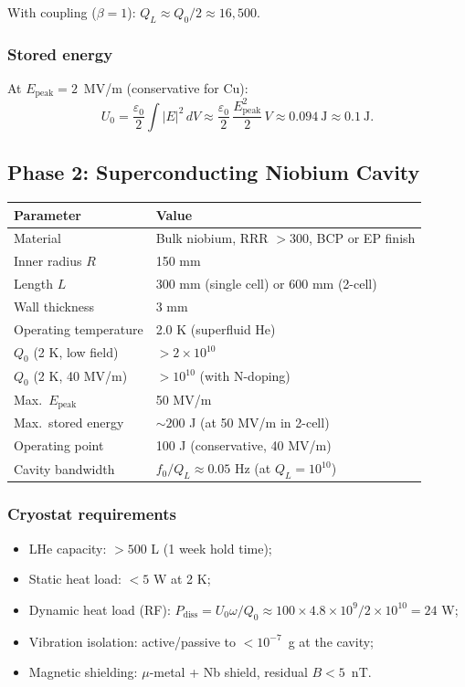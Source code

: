 \documentclass[12pt,letterpaper]{article}
\begin{document}
With coupling ($\beta = 1$): $Q_L \approx Q_0/2 \approx 16{,}500$.

\subsubsection{Stored energy}

At $E_{\text{peak}} = 2$~MV/m (conservative for Cu):
\begin{equation}
  U_0 = \frac{\varepsilon_0}{2}\int |E|^2\,dV
  \approx \frac{\varepsilon_0}{2}\,\frac{E_{\text{peak}}^2}{2}\,V
  \approx 0.094~\text{J} \approx 0.1~\text{J}.
\end{equation}

\subsection{Phase 2: Superconducting Niobium Cavity}

\begin{tabular}{ll}
\toprule
Parameter & Value \\
\midrule
Material & Bulk niobium, RRR $> 300$, BCP or EP finish \\
Inner radius $R$ & 150 mm \\
Length $L$ & 300 mm (single cell) or 600 mm (2-cell) \\
Wall thickness & 3 mm \\
Operating temperature & 2.0 K (superfluid He) \\
$Q_0$ (2 K, low field) & $> 2 \times 10^{10}$ \\
$Q_0$ (2 K, 40 MV/m) & $> 10^{10}$ (with N-doping) \\
Max.\ $E_{\text{peak}}$ & 50 MV/m \\
Max.\ stored energy & $\sim 200$ J (at 50 MV/m in 2-cell) \\
Operating point & 100 J (conservative, 40 MV/m) \\
Cavity bandwidth & $f_0/Q_L \approx 0.05$ Hz (at $Q_L = 10^{10}$) \\
\bottomrule
\end{tabular}

\subsubsection{Cryostat requirements}

\begin{itemize}[noitemsep]
  \item LHe capacity: $> 500$ L (1 week hold time);
  \item Static heat load: $< 5$ W at 2 K;
  \item Dynamic heat load (RF): $P_{\text{diss}} = U_0\omega/Q_0
    \approx 100 \times 4.8\times 10^9 / 2\times 10^{10} = 24$ W;
  \item Vibration isolation: active/passive to $< 10^{-7}$~g
    at the cavity;
  \item Magnetic shielding: $\mu$-metal + Nb shield,
    residual $B < 5$~nT.
\end{itemize}
\end{document}
